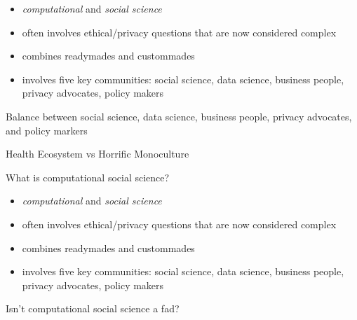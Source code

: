 \documentclass{beamer}
\def\vf{\vfill}
\begin{document}
\begin{frame}

\begin{itemize}
\item \emph{computational} and \emph{social science}
\item often involves ethical/privacy questions that are now considered complex
\item combines readymades and custommades
\pause
\item involves five key communities: social science, data science, business people, privacy advocates, policy makers
\end{itemize}

\end{frame}
\begin{frame}

\begin{center}
Balance between social science, data science, business people, privacy advocates, and policy markers\\
\end{center}
\vf
\begin{center}
Health Ecosystem vs Horrific Monoculture
\end{center}

\end{frame}
\begin{frame}

\begin{center}
\LARGE{What is computational social science?}
\end{center}

\begin{itemize}
\item \emph{computational} and \emph{social science}
\item often involves ethical/privacy questions that are now considered complex
\item combines readymades and custommades
\item involves five key communities: social science, data science, business people, privacy advocates, policy makers
\end{itemize}

\end{frame}
\begin{frame}

\begin{center}
\LARGE{Isn't computational social science a fad?}
\end{center}

\end{frame}
\end{document}
